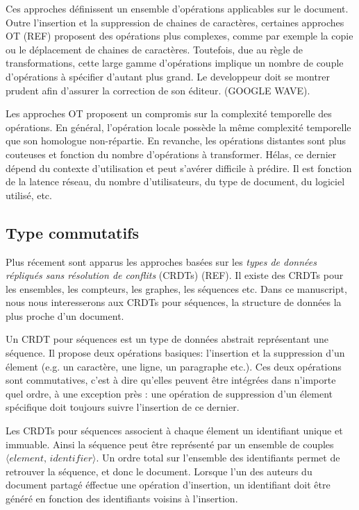Ces approches définissent un ensemble d'opérations applicables sur le
document. Outre l'insertion et la suppression de chaines de caractères,
certaines approches OT (REF) proposent des opérations plus complexes, comme par
exemple la copie ou le déplacement de chaines de caractères. Toutefois, due au
règle de transformations, cette large gamme d'opérations implique un nombre de
couple d'opérations à spécifier d'autant plus grand. Le developpeur doit se
montrer prudent afin d'assurer la correction de son éditeur. (GOOGLE WAVE).

Les approches OT proposent un compromis sur la complexité temporelle des
opérations. En général, l'opération locale possède la même complexité
temporelle que son homologue non-répartie. En revanche, les opérations
distantes sont plus couteuses et fonction du nombre d'opérations à transformer.
Hélas, ce dernier dépend du contexte d'utilisation et peut s'avérer difficile à
prédire. Il est fonction de la latence réseau, du nombre d'utilisateurs, du
type de document, du logiciel utilisé, etc.

\subsection{Type commutatifs}
Plus récement sont apparus les approches basées sur les \emph{types de données
  répliqués sans résolution de conflits} (CRDTs) (REF). Il existe des CRDTs
pour les ensembles, les compteurs, les graphes, les séquences etc. Dans ce
manuscript, nous nous interesserons aux CRDTs pour séquences, la structure de
données la plus proche d'un document.

Un CRDT pour séquences est un type de données abstrait représentant une
séquence. Il propose deux opérations basiques: l'insertion et la suppression
d'un élement (e.g. un caractère, une ligne, un paragraphe etc.). Ces deux
opérations sont commutatives, c'est à dire qu'elles peuvent être intégrées dans
n'importe quel ordre, à une exception près : une opération de suppression d'un
élement spécifique doit toujours suivre l'insertion de ce dernier.

Les CRDTs pour séquences associent à chaque élement un identifiant unique et
immuable. Ainsi la séquence peut être représenté par un ensemble de couples
$\langle element,\, identifier \rangle$. Un ordre total sur l'ensemble des
identifiants permet de retrouver la séquence, et donc le document.  Lorsque
l'un des auteurs du document partagé éffectue une opération d'insertion, un
identifiant doit être généré en fonction des identifiants voisins à
l'insertion.

